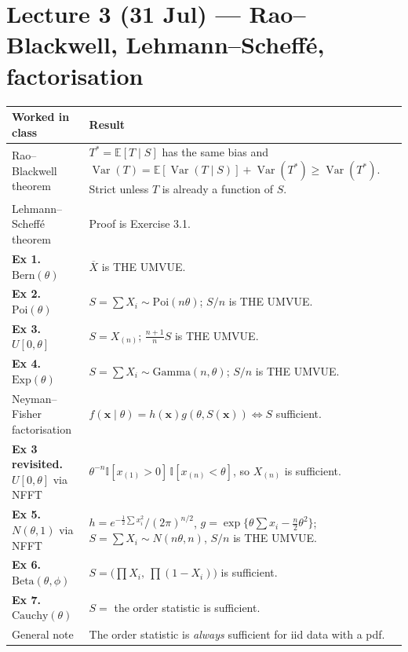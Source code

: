 \documentclass[11pt]{article}
\newcommand{\E}{\mathbb{E}}
\newcommand{\Var}{\operatorname{Var}}
\newcommand{\Xbar}{\overline{X}}
\newcommand{\I}{\mathbb{I}}
\begin{document}
\section*{Lecture 3 (31 Jul) --- Rao--Blackwell, Lehmann--Scheff\'e, factorisation}
\begin{longtable}{@{}p{7.2cm}p{9.0cm}@{}}
\toprule
\textbf{Worked in class} & \textbf{Result} \\
\midrule
Rao--Blackwell theorem &
$T^*=\E[T\mid S]$ has the same bias and $\Var(T)=\E[\Var(T\mid S)]+\Var(T^*)\ge\Var(T^*)$.
Strict unless $T$ is already a function of $S$. \\
Lehmann--Scheff\'e theorem & Proof is Exercise 3.1. \\
\textbf{Ex 1.} $\mathrm{Bern}(\theta)$ & $\Xbar$ is THE UMVUE. \\
\textbf{Ex 2.} $\mathrm{Poi}(\theta)$ & $S=\sum X_i\sim\mathrm{Poi}(n\theta)$; $S/n$ is THE UMVUE. \\
\textbf{Ex 3.} $U[0,\theta]$ & $S=X_{(n)}$; $\tfrac{n+1}{n}S$ is THE UMVUE. \\
\textbf{Ex 4.} $\mathrm{Exp}(\theta)$ & $S=\sum X_i\sim\mathrm{Gamma}(n,\theta)$; $S/n$ is THE UMVUE. \\
Neyman--Fisher factorisation & $f(\mathbf x\mid\theta)=h(\mathbf x)g(\theta,S(\mathbf x))\iff S$ sufficient. \\
\textbf{Ex 3 revisited.} $U[0,\theta]$ via NFFT &
$\theta^{-n}\I[x_{(1)}>0]\,\I[x_{(n)}<\theta]$, so $X_{(n)}$ is sufficient. \\
\textbf{Ex 5.} $N(\theta,1)$ via NFFT &
$h=e^{-\frac12\sum x_i^2}/(2\pi)^{n/2}$, $g=\exp\{\theta\sum x_i-\tfrac n2\theta^2\}$;
$S=\sum X_i\sim N(n\theta,n)$, $S/n$ is THE UMVUE. \\
\textbf{Ex 6.} $\mathrm{Beta}(\theta,\phi)$ &
$S=\big(\prod X_i,\ \prod(1-X_i)\big)$ is sufficient. \\
\textbf{Ex 7.} $\mathrm{Cauchy}(\theta)$ &
$S=$ the order statistic is sufficient. \\
General note & The order statistic is \emph{always} sufficient for iid data with a pdf. \\
\bottomrule
\end{longtable}
\end{document}
